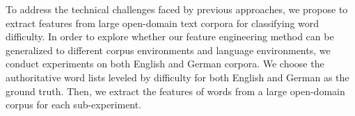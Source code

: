 To address the technical challenges faced by previous approaches, 
we propose to extract features from large open-domain text corpora 
for classifying word difficulty.
In order to explore whether our feature engineering method can be generalized 
to different corpus environments and language environments,
we conduct experiments on both English and German corpora.
We choose the authoritative word lists leveled by difficulty for both 
English and German as the ground truth.  Then, we extract the features 
of words from a large open-domain corpus for each sub-experiment.

